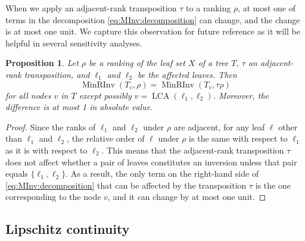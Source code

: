 \documentclass[11pt]{article}
\numberwithin{equation}{section}
\newtheorem{proposition}[theorem]{Proposition}
\theoremstyle{definition}
\theoremstyle{plain}
\DeclareMathOperator{\LCA}{LCA}
\newcommand{\ranking}{\rho}
\newcommand{\transposition}{\tau}
\DeclareMathOperator{\MRInv}{MinRInv}
\begin{document}
When we apply an adjacent-rank transposition $\transposition$ to a ranking $\ranking$, at most one of terms in the decomposition \eqref{eq:MInv:decomposition} can change, and the change is at most one unit. We capture this observation for future reference
as it will be helpful in several sensitivity analyses.
\begin{proposition}\label{prop:change}
Let $\ranking$ be a ranking of the leaf set $X$ of a tree $T$, $\transposition$ an adjacent-rank transposition, and $\ell_1$ and $\ell_2$ be the affected leaves. Then
\[ \MRInv(T_v,\ranking) = \MRInv(T_v,\transposition \ranking) \]
for all nodes $v$ in $T$ except possibly $v = \LCA(\ell_1,\ell_2)$. Moreover, the difference is at most 1 in absolute value.
\end{proposition}
\begin{proof}
Since the ranks of $\ell_1$ and $\ell_2$ under $\ranking$ are adjacent, for any leaf $\ell$ other than $\ell_1$ and $\ell_2$, the relative order of $\ell$ under $\ranking$ is the same with respect to $\ell_1$ as it is with respect to $\ell_2$. This means that the adjacent-rank transposition $\transposition$ does not affect whether a pair of leaves constitutes an inversion unless that pair equals $\{\ell_1,\ell_2\}$. As a result, the only term on the right-hand side of \eqref{eq:MInv:decomposition} that can be affected by the transposition $\transposition$ is the one corresponding to the node $v$, and it can change by at most one unit.
\end{proof}

\subsection{Lipschitz continuity}
\label{sec:lipschitz}
\end{document}
